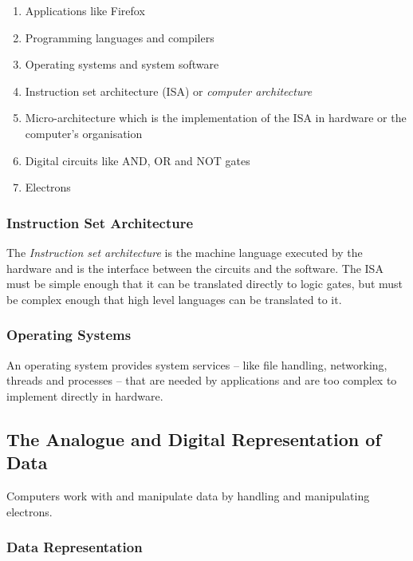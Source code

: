 \begin{enumerate}
    \item Applications like Firefox
    \item Programming languages and compilers
    \item Operating systems and system software
    \item Instruction set architecture (ISA) or \emph{computer architecture}
    \item Micro-architecture which is the implementation of the ISA in hardware or the computer's organisation
    \item Digital circuits like AND, OR and NOT gates
    \item Electrons
\end{enumerate}

\subsubsection{Instruction Set Architecture}\label{ssub:instruction_set_architecture}

The \emph{Instruction set architecture} is the machine language executed by the hardware and is the interface between the circuits and the software.
The ISA must be simple enough that it can be translated directly to logic gates, but must be complex enough that high level languages can be translated to it.

\subsubsection{Operating Systems}\label{ssub:operating_systems}

An operating system provides system services -- like file handling, networking, threads and processes -- that are needed by applications and are too complex to implement directly in hardware.

\subsection{The Analogue and Digital Representation of Data}\label{sub:the_analogue_and_digital_representation_of_data}

Computers work with and manipulate data by handling and manipulating electrons.

\subsubsection{Data Representation}\label{ssub:data_representation}

